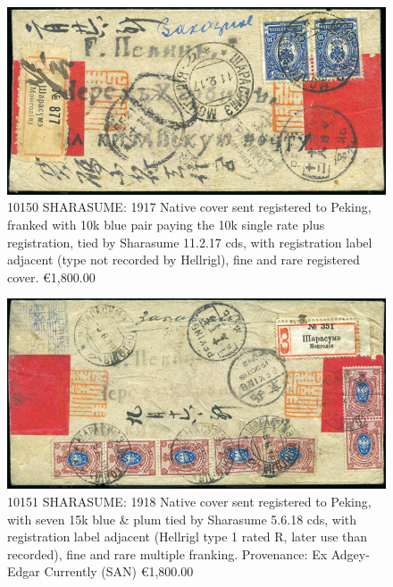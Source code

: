 \begin{figure}[htbp]
\centering
\includegraphics[width=.95\textwidth]{../russian-post-in-mongolia/10150.jpg}
\caption{ 
10150 SHARASUME: 1917 Native cover sent registered to Peking, franked with 10k
blue pair paying the 10k single rate plus registration, tied by Sharasume 11.2.17 cds,
with registration label adjacent (type not recorded by Hellrigl), 
fine and rare registered cover.
\euro 1,800.00 
} 
\end{figure}  

\begin{figure}[htbp]
\centering
\includegraphics[width=.95\textwidth]{../russian-post-in-mongolia/10151.jpg}
\caption{ 
10151 SHARASUME: 1918 Native cover sent registered to Peking, with seven 15k blue 
\& plum tied by Sharasume 5.6.18 cds, with registration label adjacent 
(Hellrigl type 1 rated R, later use than recorded), fine and 
rare multiple franking.
Provenance: Ex Adgey-Edgar
Currently (SAN) \euro1,800.00 
} 
\end{figure}


